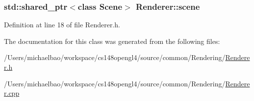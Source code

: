 \subsubsection[{scene}]{\setlength{\rightskip}{0pt plus 5cm}std\+::shared\+\_\+ptr$<$class {\bf Scene}$>$ Renderer\+::scene\hspace{0.3cm}{\ttfamily [protected]}}\label{class_renderer_a65178695d48824d3afd6fe40fd4915b6}


Definition at line 18 of file Renderer.\+h.



The documentation for this class was generated from the following files\+:\begin{DoxyCompactItemize}
\item 
/\+Users/michaelbao/workspace/cs148opengl4/source/common/\+Rendering/\hyperlink{_renderer_8h}{Renderer.\+h}\item 
/\+Users/michaelbao/workspace/cs148opengl4/source/common/\+Rendering/\hyperlink{_renderer_8cpp}{Renderer.\+cpp}\end{DoxyCompactItemize}
